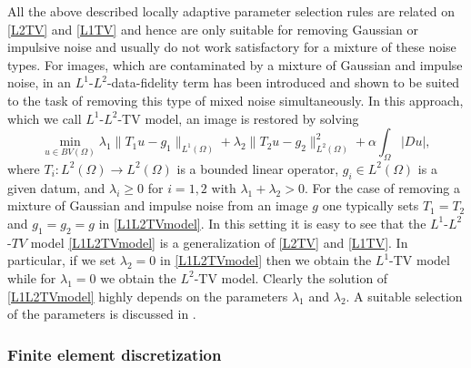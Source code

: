 \documentclass[enabledeprecatedfontcommands,cleardoublepage=empty,headsepline,twoside,11pt,DIV=15,BCOR=12mm,final]{scrartcl}
\begin{document}
All the above described locally adaptive parameter selection rules are related on \eqref{L2TV} and \eqref{L1TV} and hence are only suitable for removing Gaussian or impulsive noise and usually do not work satisfactory for a mixture of these noise types. For images, which are contaminated by a mixture of Gaussian and impulse noise, in  an $L^1$-$L^2$-data-fidelity term has been introduced and shown to be suited to the task of removing this type of mixed noise simultaneously. In this approach, which we call $L^1$-$L^2$-TV model, an image is restored by solving
\begin{equation}\label{L1L2TVmodel}
\min_{u\in BV(\Omega)} \lambda_1 \|T_1u-g_1\|_{L^1(\Omega)} +  \lambda_2 \|T_2 u-g_2\|_{L^2(\Omega)}^2 + \alpha \int_{\Omega}|Du|,
\end{equation}
where $T_i : L^2(\Omega) \to L^2(\Omega)$ is a bounded linear operator, $g_i\in L^2(\Omega)$ is a given datum, and $\lambda_i\geq 0$ for $i=1,2$ with $\lambda_1+\lambda_2>0$. For the case of removing a mixture of Gaussian and impulse noise from an image $g$ one typically sets $T_1=T_2$ and $g_1=g_2=g$ in \eqref{L1L2TVmodel}. In this setting it is easy to see that the $L^1$-$L^2$-$TV$ model \eqref{L1L2TVmodel} is a generalization of \eqref{L2TV} and \eqref{L1TV}. In particular, if we set $\lambda_2=0$ in \eqref{L1L2TVmodel} then we obtain the $L^1$-TV model while for $\lambda_1=0$ we obtain the $L^2$-TV model. Clearly the solution of \eqref{L1L2TVmodel} highly depends on the parameters $\lambda_1$ and $\lambda_2$. A suitable selection of the parameters is discussed in .



\subsubsection{Finite element discretization}
\end{document}
